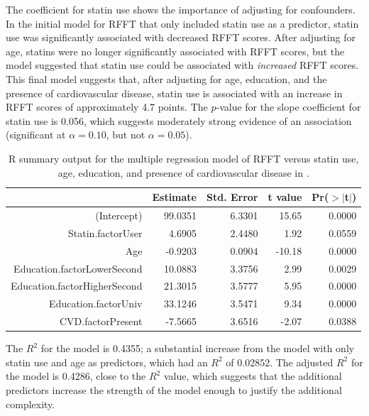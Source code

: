 The coefficient for statin use shows the importance of adjusting for confounders.  In the initial model for RFFT that only included statin use as a predictor, statin use was significantly associated with decreased RFFT scores. After adjusting for age, statins were no longer significantly associated with RFFT scores, but the model suggested that statin use could be associated with \emph{increased} RFFT scores. This final model suggests that, after adjusting for age, education, and the presence of cardiovascular disease, statin use is associated with an increase in RFFT scores of approximately 4.7 points. The $p$-value for the slope coefficient for statin use is 0.056, which suggests moderately strong evidence of an association (significant at $\alpha = 0.10$, but not $\alpha = 0.05$).

\begin{table}[ht]
\centering
\begin{tabular}{rrrrr}
  \hline
 & Estimate & Std. Error & t value & Pr($>$$|$t$|$) \\ 
  \hline
(Intercept) & 99.0351 & 6.3301 & 15.65 & 0.0000 \\ 
  Statin.factorUser & 4.6905 & 2.4480 & 1.92 & 0.0559 \\ 
  Age & -0.9203 & 0.0904 & -10.18 & 0.0000 \\ 
  Education.factorLowerSecond & 10.0883 & 3.3756 & 2.99 & 0.0029 \\ 
  Education.factorHigherSecond & 21.3015 & 3.5777 & 5.95 & 0.0000 \\ 
  Education.factorUniv & 33.1246 & 3.5471 & 9.34 & 0.0000 \\ 
  CVD.factorPresent & -7.5665 & 3.6516 & -2.07 & 0.0388 \\ 
   \hline
\end{tabular}
\caption{\textsf{R} summary output for the multiple regression model of RFFT versus statin use, age, education, and presence of cardiovascular disease in .} 
\label{prevendRFFTStatinAgeEducationCVD}
\end{table}

The $R^2$ for the model is 0.4355; a substantial increase from the model with only statin use and age as predictors, which had an $R^2$ of 0.02852. The adjusted $R^2$ for the model is 0.4286, close to the $R^2$ value, which suggests that the additional predictors increase the strength of the model enough to justify the additional complexity.

